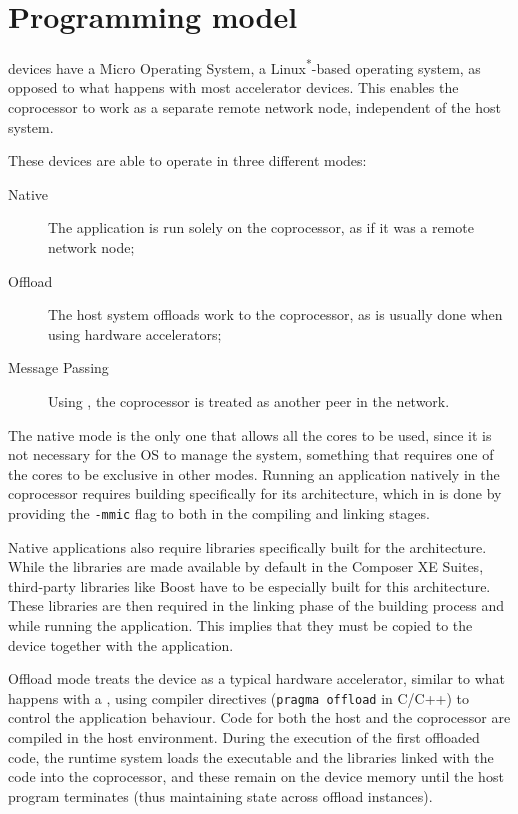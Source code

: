 \documentclass[../thesis]{subfiles}
\begin{document}
	\section{Programming model}
	\label{sec:mic:programming}

	\intel\mic devices \cite{Intel:XeonPhi:QuickStartGuide} have a Micro Operating System, a Linux\textsuperscript{*}-based operating system, as opposed to what happens with most accelerator devices. This enables the coprocessor to work as a separate remote network node, independent of the host system.

	These devices are able to operate in three different modes:
		\begin{description}
			\item [Native] The application is run solely on the coprocessor, as if it was a remote network node;
			\item [Offload] The host system offloads work to the coprocessor, as is usually done when using hardware accelerators;
			\item [Message Passing] Using \mpi, the coprocessor is treated as another peer in the network.
		\end{description}

	The native mode is the only one that allows all the cores to be used, since it is not necessary for the OS to manage the system, something that requires one of the cores to be exclusive in other modes. Running an application natively in the coprocessor requires building specifically for its architecture, which in \icpc is done by providing the \texttt{-mmic} flag to both in the compiling and linking stages.

	Native applications also require libraries specifically built for the \intel\mic architecture. While the \intel libraries are made available by default in the \intel Composer XE Suites, third-party libraries like Boost have to be especially built for this architecture. These libraries are then required in the linking phase of the building process and while running the application. This implies that they must be copied to the device together with the application. 

	Offload mode treats the device as a typical hardware accelerator, similar to what happens with a \gpu, using compiler directives (\texttt{pragma offload} in C/C++) to control the application behaviour. Code for both the host and the coprocessor are compiled in the host environment. During the execution of the first offloaded code, the runtime system loads the executable and the libraries linked with the code into the coprocessor, and these remain on the device memory until the host program terminates (thus maintaining state across offload instances).
\end{document}
